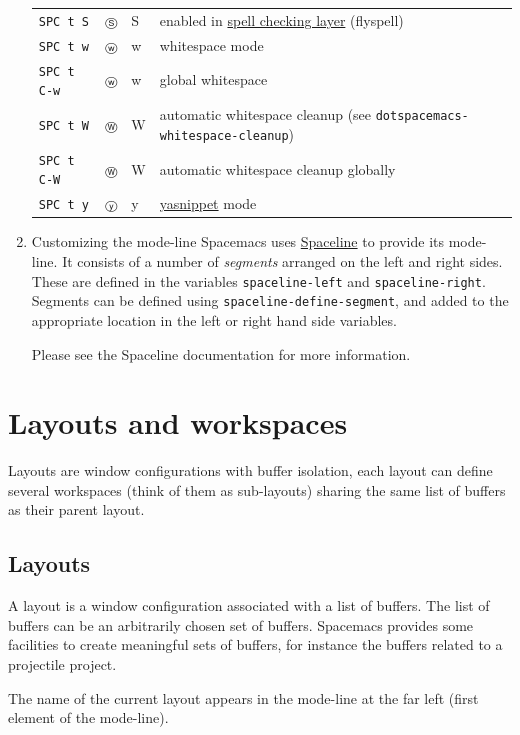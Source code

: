 \documentclass[11pt]{article}
\begin{document}
\begin{enumerate}
\begin{center}
\begin{tabular}{llll}
\texttt{SPC t S} & \texttt{Ⓢ} & S & enabled in \href{../layers/+checkers/spell-checking/README.org}{spell checking layer} (flyspell)\\
\texttt{SPC t w} & \texttt{ⓦ} & w & whitespace mode\\
\texttt{SPC t C-w} & \texttt{ⓦ} & w & global whitespace\\
\texttt{SPC t W} & \texttt{Ⓦ} & W & automatic whitespace cleanup (see \texttt{dotspacemacs-whitespace-cleanup})\\
\texttt{SPC t C-W} & \texttt{Ⓦ} & W & automatic whitespace cleanup globally\\
\texttt{SPC t y} & \texttt{ⓨ} & y & \href{https://github.com/capitaomorte/yasnippet}{yasnippet} mode\\
\end{tabular}
\end{center}

\item Customizing the mode-line
\label{sec:org294bff0}
Spacemacs uses \href{https://github.com/TheBB/spaceline}{Spaceline} to provide its mode-line. It consists of a number of
\emph{segments} arranged on the left and right sides. These are defined in the
variables \texttt{spaceline-left} and \texttt{spaceline-right}. Segments can be defined using
\texttt{spaceline-define-segment}, and added to the appropriate location in the left or
right hand side variables.

Please see the Spaceline documentation for more information.
\end{enumerate}

\section{Layouts and workspaces}
\label{sec:org5de7fb6}
Layouts are window configurations with buffer isolation, each layout can define
several workspaces (think of them as sub-layouts) sharing the same list of
buffers as their parent layout.

\subsection{Layouts}
\label{sec:orgdb625b5}
A layout is a window configuration associated with a list of buffers. The list
of buffers can be an arbitrarily chosen set of buffers. Spacemacs provides
some facilities to create meaningful sets of buffers, for instance the buffers
related to a projectile project.

The name of the current layout appears in the mode-line at the far left (first
element of the mode-line).
\end{document}
